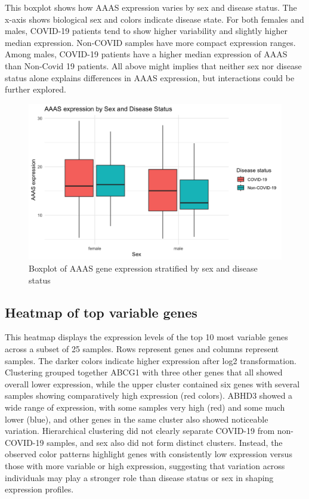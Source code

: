 \documentclass{article}
\begin{document}
This boxplot shows how AAAS expression varies by sex and disease status. The x-axis shows biological sex and colors indicate disease state. For both females and males, COVID-19 patients tend to show higher variability and slightly higher median expression. Non-COVID samples have more compact expression ranges. Among males, COVID-19 patients have a higher median expression of AAAS than Non-Covid 19 patients. All above might implies that neither sex nor disease status alone explains differences in AAAS expression, but interactions could be further explored.

\begin{figure}[H]
\centering
\includegraphics[width=0.80\linewidth]{AAAS expression by Sex and Disease Status.png}
\caption{\label{fig:boxplot}Boxplot of AAAS gene expression stratified by sex and disease status}
\end{figure}

\subsection{Heatmap of top variable genes}

This heatmap displays the expression levels of the top 10 most variable genes across a subset of 25 samples. Rows represent genes and columns represent samples. The darker colors indicate higher expression after log2 transformation. Clustering grouped together ABCG1 with three other genes that all showed overall lower expression, while the upper cluster contained six genes with several samples showing comparatively high expression (red colors). ABHD3 showed a wide range of expression, with some samples very high (red) and some much lower (blue), and other genes in the same cluster also showed noticeable variation. Hierarchical clustering did not clearly separate COVID-19 from non-COVID-19 samples, and sex also did not form distinct clusters. Instead, the observed color patterns highlight genes with consistently low expression versus those with more variable or high expression, suggesting that variation across individuals may play a stronger role than disease status or sex in shaping expression profiles.
\end{document}
